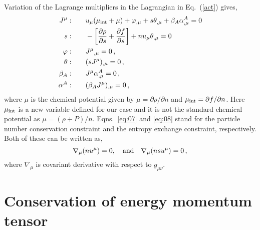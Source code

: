 \documentclass[a4paper,12pt]{article}
\newcommand{\nb}{\ensuremath{ \nabla }}
\newcommand{\m}{\ensuremath{{\mu \nu}}}
\newcommand{\p}{\ensuremath{\partial{}}}
\begin{document}
Variation of the Lagrange multipliers in the Lagrangian in Eq.~(\ref{act}) gives,
\begin{align}
  J^{\mu}:& \qquad	u_{\mu}(\mu_{\rm int} + \mu) +\varphi_{,\mu}+s\theta_{,\mu}+\beta_A\alpha^A_{,\mu} = 0
\label{jeqn}\\ 
s:& \qquad -\left[\frac{\partial \rho}{\partial s}+\frac{\partial f}{\partial s}\right]+nu_{\mu}\theta_{,\mu}=0 \\  
\varphi:& \qquad J^\mu{}_{,\mu}=0 \,,\label{eq:07}\\
\theta:& \qquad (sJ^\mu)_{,\mu}=0 \,,\label{eq:08}\\
\beta_A:& \qquad J^\mu\alpha^A_{,\mu}=0 \,,\label{eq:09}\\
\alpha^A:& \qquad (\beta_AJ^\mu)_{,\mu}=0 \,,\label{eq:10}
\end{align}
where $\mu$ is the chemical potential given by $\mu = {\p \rho}/{\p
  n}$ and $\mu_{\rm int} = {\p f}/{\p n}$. Here $\mu_{\rm int}$ is a new variable defined for our case and it is not the standard chemical potential as
$\mu=(\rho+P)/n$. Eqns.~\eqref{eq:07} and \eqref{eq:08} stand for the
particle number conservation constraint and the entropy exchange
constraint, respectively. Both of these can be written as,
\begin{equation}
\nb_{\mu }(n u^{\mu}) = 0, \quad {\rm and} \quad  \nb_{\mu}(n s u^{\mu}) = 0\,,
\label{eq:constraint relation}
\end{equation}
where $\nb_{\mu }$ is covariant derivative with respect to $g_{\m}$.
\section{Conservation of energy momentum tensor}
\end{document}
